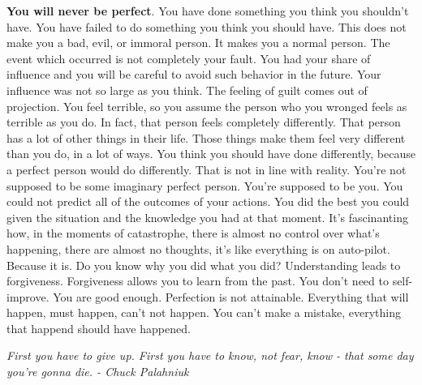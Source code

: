 \documentclass[a4paper,hidelinks]{article}
\begin{document}
\textbf{You will never be perfect}.
You have done something you think you shouldn't have.
You have failed to do something you think you should have.
This does not make you a bad, evil, or immoral person.
It makes you a normal person.
The event which occurred is not completely your fault.
You had your share of influence and you will be careful to avoid such behavior in the future.
Your influence was not so large as you think.
The feeling of guilt comes out of projection.
You feel terrible, so you assume the person who you wronged feels as terrible as you do.
In fact, that person feels completely differently.
That person has a lot of other things in their life.
Those things make them feel very different than you do, in a lot of ways.
You think you should have done differently, because a perfect person would do differently.
That is not in line with reality.
You're not supposed to be some imaginary perfect person.
You're supposed to be you.
You could not predict all of the outcomes of your actions.
You did the best you could given the situation and the knowledge you had at that moment.
It's fascinanting how, in the moments of catastrophe, there is almost no control over what's happening, there are almost no thoughts, it's like everything is on auto-pilot.
Because it is.
Do you know why you did what you did?
Understanding leads to forgiveness.
Forgiveness allows you to learn from the past.
You don't need to self-improve.
You are good enough.
Perfection is not attainable.
Everything that will happen, must happen, can't not happen.
You can't make a mistake, everything that happend should have happened.

\newpage

\begin{center}
\textit{
First you have to give up. First you have to know, not fear, know - that some day you’re gonna die. - Chuck Palahniuk
}
\end{center}
\end{document}
